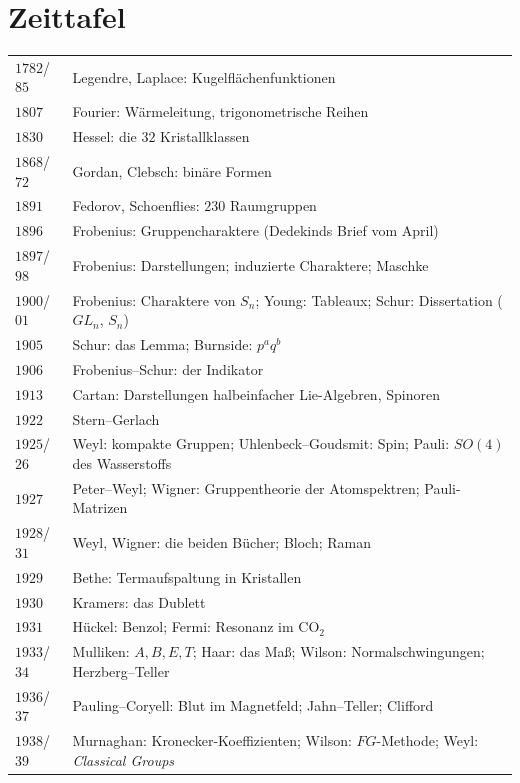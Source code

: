 \section{Zeittafel}

\begin{merksatz}
\begin{center}
{\small
\renewcommand{\arraystretch}{1.42}
\begin{tabular}{@{}P{1.2cm}P{7.4cm}@{}}
\toprule
$1782$/$85$ & Legendre, Laplace: Kugelflächenfunktionen\\
$1807$ & Fourier: Wärmeleitung, trigonometrische Reihen\\
$1830$ & Hessel: die $32$ Kristallklassen\\
$1868$/$72$ & Gordan, Clebsch: binäre Formen\\
$1891$ & Fedorov, Schoenflies: $230$ Raumgruppen\\
$1896$ & Frobenius: Gruppencharaktere (Dedekinds Brief vom April)\\
$1897$/$98$ & Frobenius: Darstellungen; induzierte Charaktere; Maschke\\
$1900$/$01$ & Frobenius: Charaktere von $S_n$; Young: Tableaux; Schur: Dissertation ($GL_n$, $S_n$)\\
$1905$ & Schur: das Lemma; Burnside: $p^{a}q^{b}$\\
$1906$ & Frobenius--Schur: der Indikator\\
$1913$ & Cartan: Darstellungen halbeinfacher Lie-Algebren, Spinoren\\
$1922$ & Stern--Gerlach\\
$1925$/$26$ & Weyl: kompakte Gruppen; Uhlenbeck--Goudsmit: Spin; Pauli: $SO(4)$ des Wasserstoffs\\
$1927$ & Peter--Weyl; Wigner: Gruppentheorie der Atomspektren; Pauli-Matrizen\\
$1928$/$31$ & Weyl, Wigner: die beiden Bücher; Bloch; Raman\\
$1929$ & Bethe: Termaufspaltung in Kristallen\\
$1930$ & Kramers: das Dublett\\
$1931$ & Hückel: Benzol; Fermi: Resonanz im $\mathrm{CO_2}$\\
$1933$/$34$ & Mulliken: $A, B, E, T$; Haar: das Maß; Wilson: Normalschwingungen; Herzberg--Teller\\
$1936$/$37$ & Pauling--Coryell: Blut im Magnetfeld; Jahn--Teller; Clifford\\
$1938$/$39$ & Murnaghan: Kronecker-Koeffizienten; Wilson: $FG$-Methode; Weyl: \textit{Classical Groups}\\

\end{tabular}}
\end{center}
\end{merksatz}
